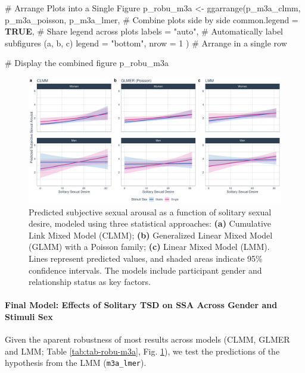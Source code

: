 \documentclass[
  bookmarksnumbered]{article}
\newenvironment{Shaded}{\begin{snugshade}}{\end{snugshade}}
\newcommand{\AttributeTok}[1]{\textcolor[rgb]{0.80,0.80,0.80}{#1}}
\newcommand{\CommentTok}[1]{\textcolor[rgb]{0.50,0.62,0.50}{#1}}
\newcommand{\ConstantTok}[1]{\textcolor[rgb]{0.86,0.64,0.64}{\textbf{#1}}}
\newcommand{\DecValTok}[1]{\textcolor[rgb]{0.86,0.86,0.80}{#1}}
\newcommand{\FunctionTok}[1]{\textcolor[rgb]{0.94,0.94,0.56}{#1}}
\newcommand{\NormalTok}[1]{\textcolor[rgb]{0.80,0.80,0.80}{#1}}
\newcommand{\OtherTok}[1]{\textcolor[rgb]{0.94,0.94,0.56}{#1}}
\newcommand{\StringTok}[1]{\textcolor[rgb]{0.80,0.58,0.58}{#1}}
\begin{document}
\begin{Shaded}
\begin{Highlighting}[]
\CommentTok{\# Arrange Plots into a Single Figure}
\NormalTok{p\_robu\_m3a }\OtherTok{\textless{}{-}} \FunctionTok{ggarrange}\NormalTok{(p\_m3a\_clmm, p\_m3a\_poisson, p\_m3a\_lmer, }\CommentTok{\# Combine plots side by side}
  \AttributeTok{common.legend =} \ConstantTok{TRUE}\NormalTok{, }\CommentTok{\# Share legend across plots}
  \AttributeTok{labels =} \StringTok{"auto"}\NormalTok{, }\CommentTok{\# Automatically label subfigures (a, b, c)}
  \AttributeTok{legend =} \StringTok{"bottom"}\NormalTok{,}
  \AttributeTok{nrow =} \DecValTok{1}
\NormalTok{) }\CommentTok{\# Arrange in a single row}

\CommentTok{\# Display the combined figure}
\NormalTok{p\_robu\_m3a}
\end{Highlighting}
\end{Shaded}

\begin{figure}
\centering
\includegraphics{Sexual_Desire_Arousal_V2_files/figure-latex/preds-m3a-1.pdf}
\caption{\label{fig:preds-m3a}Predicted subjective sexual arousal as a function of solitary sexual desire, modeled using three statistical approaches: \textbf{(a)} Cumulative Link Mixed Model (CLMM); \textbf{(b)} Generalized Linear Mixed Model (GLMM) with a Poisson family; \textbf{(c)} Linear Mixed Model (LMM). Lines represent predicted values, and shaded areas indicate 95\% confidence intervals. The models include participant gender and relationship status as key factors.}
\end{figure}

\paragraph{Final Model: Effects of Solitary TSD on SSA Across Gender and Stimuli Sex}\label{final-model-effects-of-solitary-tsd-on-ssa-across-gender-and-stimuli-sex-1}

Given the aparent robustness of most results across models (CLMM, GLMER and LMM; Table \ref{tab:tab-robu-m3a}, Fig. \ref{fig:preds-m3a}), we test the predictions of the hypothesis from the LMM (\texttt{m3a\_lmer}).
\end{document}
